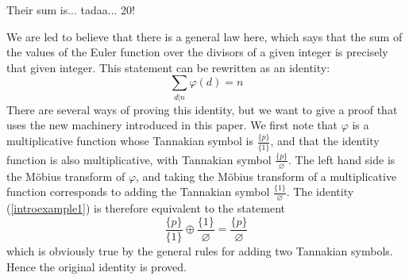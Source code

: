 \documentclass[a4paper]{article}
\begin{document}
\begin{example}
Their sum is... tadaa... 20!

We are led to believe that there is a general law here, which says that the sum of the values of the Euler function over the divisors of a given integer is precisely that given integer. This statement can be rewritten as an identity:
\begin{equation} \label{introexample1}
\sum_{d \vert n} \varphi(d) = n  
\end{equation}
There are several ways of proving this identity, but we want to give a proof that uses the new machinery introduced in this paper. We first note that $\varphi$ is a multiplicative function whose Tannakian symbol is $\frac{ \{ p  \} }{ \{  1 \}  }$, and that the identity function is also multiplicative, with Tannakian symbol $\frac{ \{ p  \} }{ \varnothing  }$. The left hand side is the M{\"o}bius transform of $\varphi$, and taking the M{\"o}bius transform of a multiplicative function corresponds to adding the Tannakian symbol $\frac{ \{ 1  \} }{ \varnothing } $. The identity (\ref{introexample1}) is therefore equivalent to the statement 
\begin{equation}
\frac{ \{ p  \} }{ \{  1 \}  } \oplus \frac{ \{ 1  \} }{ \varnothing  } = \frac{ \{ p  \} }{ \varnothing  }
\end{equation}
which is obviously true by the general rules for adding two Tannakian symbols. Hence the original identity is proved.
\end{example}
\end{document}

